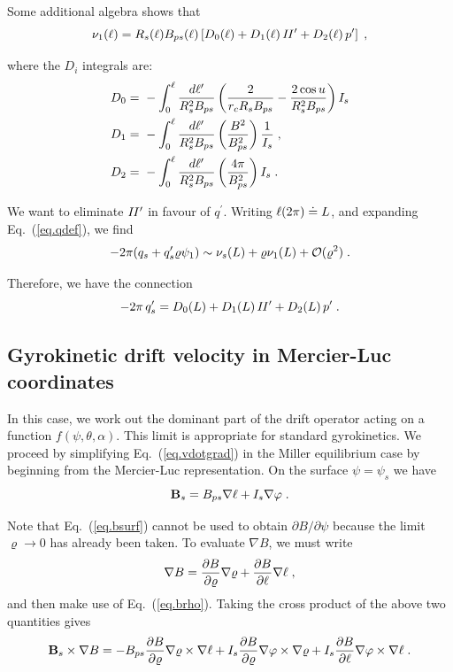 \noindent
Some additional algebra shows that
%
\begin{equation}
\nu_1(\ell) = R_s(\ell) B_{ps}(\ell) \left[
D_0(\ell) + D_1(\ell) \, I\hskip -1pt I^\prime + D_2(\ell) \, p^\prime 
\right] \; ,
\end{equation}

\noindent
where the $D_i$ integrals are:
%
\begin{align}
D_0 = &~ -\int_0^\ell \frac{d\ell^\prime}{R_s^2 B_{ps}} \left( 
\frac{2}{r_c R_s B_{ps}} - \frac{2\cos u}{R_s^2 B_{ps}} \right) I_s \\
D_1 = &~ -\int_0^\ell \frac{d\ell^\prime}{R_s^2 B_{ps}} \left( 
\frac{B^2}{B_{ps}^2} \right) \frac{1}{I_s} \; , \\
D_2 = &~ -\int_0^\ell \frac{d\ell^\prime}{R_s^2 B_{ps}} \left( 
\frac{4\pi}{B_{ps}^2} \right) I_s \; .
\end{align}

\noindent
We want to eliminate $I\hskip -1pt I^\prime$ in favour of $q^\prime$.  Writing 
$\ell(2\pi) \doteq L$, and expanding Eq.~(\ref{eq.qdef}), we 
find 
%
\begin{equation}
-2\pi (q_s + q_s^\prime \varrho \psi_1) \sim 
\nu_s(L) + \varrho \nu_1(L) + {\mathcal O}(\varrho^2) \; .
\end{equation}

\noindent
Therefore, we have the connection
%
\begin{equation}
-2\pi \, q_s^\prime = D_0(L) + D_1(L) \, I\hskip -1pt I^\prime + D_2(L) \, p^\prime \; .
\end{equation}

\subsection{Gyrokinetic drift velocity in Mercier-Luc coordinates}

In this case, we work out the dominant part of the drift 
operator acting on a function $f(\psi,\theta,\alpha)$.
This limit is appropriate for standard gyrokinetics.
We proceed by simplifying Eq.~(\ref{eq.vdotgrad}) in the 
Miller equilibrium case by beginning from the Mercier-Luc 
representation.  On the surface $\psi = \psi_s$ we have
%
\begin{equation}
\mathbf{B}_s = B_{ps} \nabla\ell + I_s \nabla \varphi \; . 
\label{eq.bsurf}
\end{equation}

\noindent
Note that Eq.~(\ref{eq.bsurf}) cannot be used to obtain 
$\partial B/\partial\psi$ because the limit $\varrho \rightarrow 0$ 
has already been taken.  To evaluate $\nabla B$, we must write
%
\begin{equation}
\nabla B = \frac{\partial B}{\partial\varrho} \nabla\varrho +
\frac{\partial B}{\partial\ell} \nabla\ell \; ,
\end{equation}
%
and then make use of Eq.~(\ref{eq.brho}).  Taking the cross product 
of the above two quantities gives
%
\begin{equation}
\mathbf{B}_s \times \nabla B = 
-B_{ps} \frac{\partial B}{\partial\varrho} 
 \nabla\varrho\times\nabla\ell
+I_s \frac{\partial B}{\partial\varrho} 
 \nabla\varphi\times\nabla\varrho
+I_s \frac{\partial B}{\partial\ell} 
 \nabla\varphi\times\nabla\ell \; .
\label{eq.mldrift}
\end{equation}

